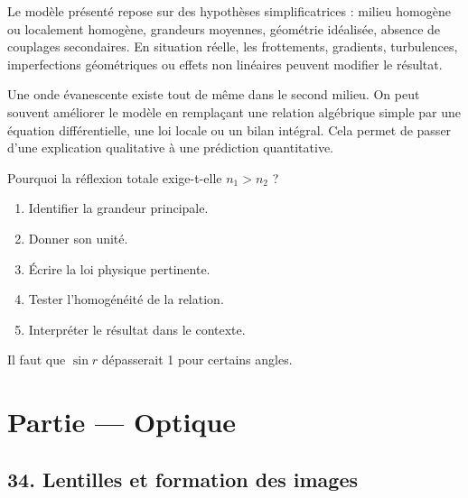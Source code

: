 \documentclass[11pt,a4paper]{article}
\begin{document}
\begin{attentionbox}
Le modèle présenté repose sur des hypothèses simplificatrices : milieu homogène ou localement homogène, grandeurs moyennes, géométrie idéalisée, absence de couplages secondaires. En situation réelle, les frottements, gradients, turbulences, imperfections géométriques ou effets non linéaires peuvent modifier le résultat.
\end{attentionbox}

\begin{approfondissementbox}
Une onde évanescente existe tout de même dans le second milieu.
On peut souvent améliorer le modèle en remplaçant une relation algébrique simple par une équation différentielle, une loi locale ou un bilan intégral. Cela permet de passer d'une explication qualitative à une prédiction quantitative.
\end{approfondissementbox}

\begin{exercicebox}
Pourquoi la réflexion totale exige-t-elle $n_1>n_2$ ?
\begin{enumerate}
  \item Identifier la grandeur principale.
  \item Donner son unité.
  \item Écrire la loi physique pertinente.
  \item Tester l'homogénéité de la relation.
  \item Interpréter le résultat dans le contexte.
\end{enumerate}
\end{exercicebox}

\begin{corrigebox}[Indication]
Il faut que $\sin r$ dépasserait 1 pour certains angles.
\end{corrigebox}


\section{Partie — Optique}


\subsection{34. Lentilles et formation des images}
\end{document}
